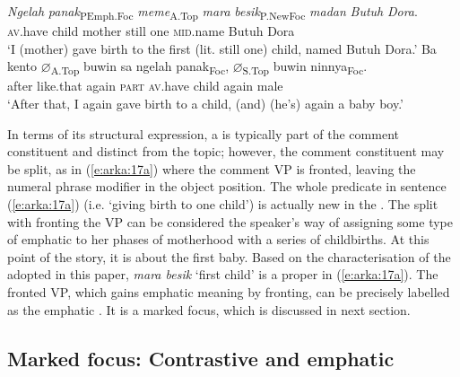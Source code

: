 \documentclass[output=paper
,modfonts
,nonflat]{langsci/langscibook}
\begin{document}
\begin{exe}
	\ex\label{e:arka:17}
	\begin{xlist}
		\ex\label{e:arka:17a}
		\gll {\ob}\textit{Ngelah} {\ob}\textit{panak}{\cb}\textsubscript{P}{\cb}\textsubscript{Emph.Foc} {\ob}\textit{meme}{\cb}\textsubscript{A.Top} {\ob}\textit{mara} \textit{besik}{\cb}\textsubscript{P.NewFoc} \textit{madan} \textit{Butuh} \textit{Dora}.\\
		\phantom{[}\textsc{av}.have  \phantom{[}child   \phantom{[}mother  \phantom{[[}still  one \textsc{mid}.name Butuh Dora\\
		\glt ‘I (mother) gave birth to the first (lit. still one) child, named Butuh Dora.’ 
		\ex\label{e:arka:17b}
		\gll Ba   kento   {\ob}${\varnothing}${\cb}\textsubscript{A.Top}  buwin   sa    ngelah   {\ob}panak{\cb}\textsubscript{Foc}, {\ob}${\varnothing}${\cb}\textsubscript{S.Top}   buwin   {\ob}ninnya{\cb}\textsubscript{Foc}.\\
		after  like.that  {}  again  \textsc{part}  \textsc{av}.have  \phantom{[}child {} again  \phantom{[}male\\
		\glt ‘After that, I again gave birth to a child, (and) (he’s) again a baby boy.’
	\end{xlist}
\end{exe}

\noindent
In terms of its structural expression, a  is typically part of the comment constituent and distinct from the topic; however, the comment constituent may be split, as in (\ref{e:arka:17a}) where the comment VP is fronted, leaving the numeral phrase modifier in the object position. The whole predicate in sentence (\ref{e:arka:17a}) (i.e. ‘giving birth to one child’) is actually new in the . The split with fronting the VP can be considered the speaker’s way of assigning some type of emphatic  to her phases of motherhood with a series of childbirths. At this point of the story, it is about the first baby. Based on the characterisation of the  adopted in this paper, \textit{mara besik} ‘first child’ is a proper  in (\ref{e:arka:17a}). The fronted VP, which gains emphatic meaning by fronting, can be precisely labelled as the emphatic . It is a marked focus, which is discussed in next section. 

\subsection{\label{arka:s4.2}Marked focus: Contrastive and emphatic}
\end{document}
